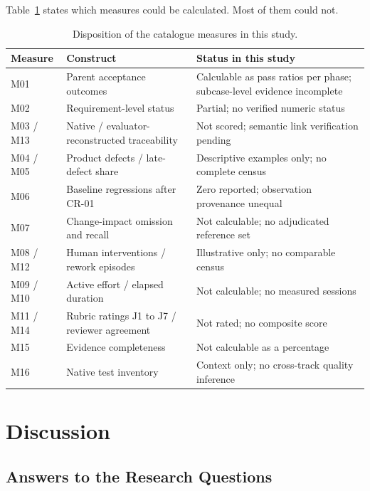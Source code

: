 \documentclass[conference]{IEEEtran}
\begin{document}
Table~\ref{tbl-metrics} states which measures could be calculated.
Most of them could not.

\begin{table}[htbp]
\caption{Disposition of the catalogue measures in this study.}\label{tbl-metrics}
\centering\footnotesize\setlength{\tabcolsep}{3pt}
\begin{tabular}{>{\raggedright\arraybackslash}p{} >{\raggedright\arraybackslash}p{} >{\raggedright\arraybackslash}p{}}
\hline
\textbf{Measure} & \textbf{Construct} & \textbf{Status in this study} \\
\hline
M01 & Parent acceptance outcomes & Calculable as pass ratios per phase; subcase-level evidence incomplete \\
M02 & Requirement-level status & Partial; no verified numeric status \\
M03 / M13 & Native / evaluator-reconstructed traceability & Not scored; semantic link verification pending \\
M04 / M05 & Product defects / late-defect share & Descriptive examples only; no complete census \\
M06 & Baseline regressions after CR-01 & Zero reported; observation provenance unequal \\
M07 & Change-impact omission and recall & Not calculable; no adjudicated reference set \\
M08 / M12 & Human interventions / rework episodes & Illustrative only; no comparable census \\
M09 / M10 & Active effort / elapsed duration & Not calculable; no measured sessions \\
M11 / M14 & Rubric ratings J1 to J7 / reviewer agreement & Not rated; no composite score \\
M15 & Evidence completeness & Not calculable as a percentage \\
M16 & Native test inventory & Context only; no cross-track quality inference \\
\hline
\end{tabular}
\end{table}

\section{Discussion}\label{discussion}

\subsection{Answers to the Research Questions}\label{answers}
\end{document}
